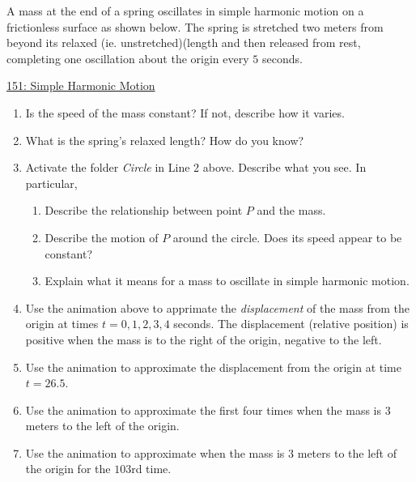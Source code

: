 \documentclass{ximera}
\begin{document}
\begin{example}  \label{Ex:LLL}
A mass at the end of a spring oscillates in simple harmonic motion on a frictionless surface as shown below. The spring is stretched two meters from beyond its relaxed (ie. unstretched)(length and then released from rest, completing one oscillation about the origin every $5$ seconds.

\begin{onlineOnly}
    \begin{center}
\end{center}
\end{onlineOnly}

\href{https://www.desmos.com/calculator/dcba538898}{151: Simple Harmonic Motion}

\begin{enumerate}
\item Is the speed of the mass constant? If not, describe how it varies.

\item What is the spring's relaxed length? How do you know?

\item Activate the folder \emph{Circle} in Line 2 above. Describe what you see. In particular,
\begin{enumerate}
\item Describe the relationship between point $P$ and the mass.

\item Describe the motion of $P$ around the circle. Does its speed appear to be constant?

\item Explain what it means for a mass to oscillate in simple harmonic motion. 
\end{enumerate}

\item Use the animation above to apprimate the \emph{displacement} of the mass from the origin at times $t=0, 1, 2, 3, 4$ seconds. The displacement (relative position) is positive when the mass is to the right of the origin, negative to the left.

\item Use the animation to approximate the displacement from the origin at time $t=26.5$.

\item Use the animation to approximate the first four times when the mass is $3$ meters to the left of the origin.

\item Use the animation to approximate when the mass is $3$ meters to the left of the origin for the $103$rd time.
\end{enumerate}
\end{example}
\end{document}

